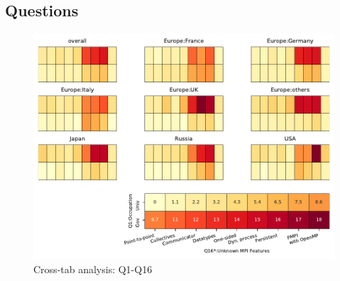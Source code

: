
\subsection{Questions}


\begin{figure}
\begin{center}
\includegraphics[width=12cm]{../pdfs/Q1-Q16.pdf}
\caption{Cross-tab analysis: Q1-Q16}
\label{fig:Q1-Q16}
\end{center}
\end{figure}
